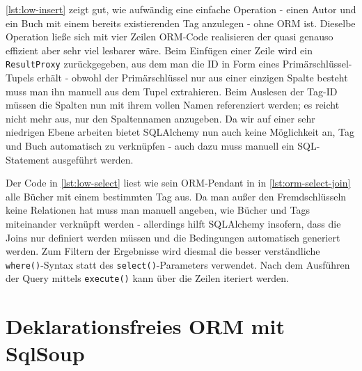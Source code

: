 \autoref{lst:low-insert} zeigt gut, wie aufwändig eine einfache Operation -
einen Autor und ein Buch mit einem bereits existierenden Tag anzulegen - ohne
ORM ist. Dieselbe Operation ließe sich mit vier Zeilen ORM-Code realisieren der
quasi genauso effizient aber sehr viel lesbarer wäre.
Beim Einfügen einer Zeile wird ein \texttt{ResultProxy} zurückgegeben, aus dem
man die ID in Form eines Primärschlüssel-Tupels erhält - obwohl der
Primärschlüssel nur aus einer einzigen Spalte besteht muss man ihn manuell aus
dem Tupel extrahieren. Beim Auslesen der Tag-ID müssen die Spalten nun mit ihrem
vollen Namen referenziert werden; es reicht nicht mehr aus, nur den Spaltennamen
anzugeben. Da wir auf einer sehr niedrigen Ebene arbeiten bietet SQLAlchemy nun
auch keine Möglichkeit an, Tag und Buch automatisch zu verknüpfen - auch dazu
muss manuell ein SQL-Statement ausgeführt werden.



Der Code in \autoref{lst:low-select} liest wie sein ORM-Pendant in in
\autoref{lst:orm-select-join} alle Bücher mit einem bestimmten Tag aus. Da man
außer den Fremdschlüsseln keine Relationen hat muss man manuell angeben, wie
Bücher und Tags miteinander verknüpft werden - allerdings hilft SQLAlchemy
insofern, dass die Joins nur definiert werden müssen und die Bedingungen
automatisch generiert werden. Zum Filtern der Ergebnisse wird diesmal die besser
verständliche \texttt{where()}-Syntax statt des \texttt{select()}-Parameters
verwendet. Nach dem Ausführen der Query mittels \texttt{execute()} kann über die
Zeilen iteriert werden.



\section{Deklarationsfreies ORM mit SqlSoup}

